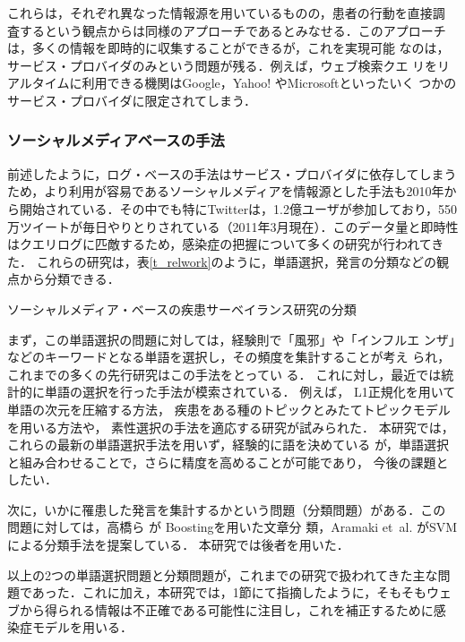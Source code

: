 \documentclass[japanese]{jnlp_1.4}
\begin{document}
これらは，それぞれ異なった情報源を用いているものの，患者の行動を直接調
査するという観点からは同様のアプローチであるとみなせる．このアプローチ
は，多くの情報を即時的に収集することができるが，これを実現可能
なのは，サービス・プロバイダのみという問題が残る．例えば，ウェブ検索クエ
リをリアルタイムに利用できる機関はGoogle，Yahoo! やMicrosoftといったいく
つかのサービス・プロバイダに限定されてしまう．


\subsubsection{ソーシャルメディアベースの手法}

前述したように，ログ・ベースの手法はサービス・プロバイダに依存してしまうため，より利用が容易であるソーシャルメディアを情報源とした手法も2010年から開始されている．その中でも特にTwitterは，1.2億ユーザが参加しており，550万ツイートが毎日やりとりされている（2011年3月現在）．このデータ量と即時性はクエリログに匹敵するため，感染症の把握について多くの研究が行われてき
た\cite{Lampos2010,Culotta2010,Paul2011,Aramaki2011,Tanida2011}．
これらの研究は，表\ref{t_relwork}のように，単語選択，発言の分類などの観点から分類できる．

\begin{table}[b]
\caption{ソーシャルメディア・ベースの疾患サーベイランス研究の分類}
\label{t_relwork}

\end{table}

まず，この単語選択の問題に対しては，経験則で「風邪」や「インフルエ
ンザ」などのキーワードとなる単語を選択し，その頻度を集計することが考え
られ，これまでの多くの先行研究はこの手法をとってい
る\cite{Culotta2010,Aramaki2011}．
これに対し，最近では統計的に単語の選択を行った手法が模索されている．
例えば，
L1正規化を用いて単語の次元を圧縮する方法\cite{Lampos2010}，
疾患をある種のトピックとみたてトピックモデルを用いる方法\cite{Paul2011}や，
素性選択の手法を適応する研究\cite{Tanida2011}が試みられた．
本研究では，これらの最新の単語選択手法を用いず，経験的に語を決めている
が，単語選択と組み合わせることで，さらに精度を高めることが可能であり，
今後の課題としたい．

次に，いかに罹患した発言を集計するかという問題（分類問題）がある．この
問題に対しては，高橋ら \citeyear{Takahashi2011}が Boostingを用いた文章分
類，Aramaki et~al. \citeyear{Aramaki2011}がSVMによる分類手法を提案している．
本研究では後者を用いた．

以上の2つの単語選択問題と分類問題が，これまでの研究で扱われてきた主な問
題であった．これに加え，本研究では，1節にて指摘したように，そもそもウェ
ブから得られる情報は不正確である可能性に注目し，これを補正するために感
染症モデルを用いる．
\end{document}
